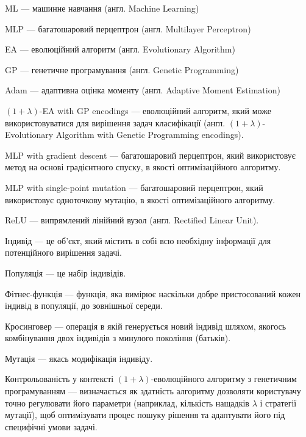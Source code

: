 ML --- машинне навчання (англ. Machine Learning)

MLP --- багатошаровий перцептрон (англ. Multilayer Perceptron)

EA --- еволюційний алгоритм (англ. Evolutionary Algorithm)

GP --- генетичне програмування (англ. Genetic Programming)

Adam --- адаптивна оцінка моменту (англ. Adaptive Moment Estimation)

$(1+\lambda)$-EA with GP encodings --- еволюційний алгоритм, який може використовуватися для вирішення задач класифікації (англ. $(1+\lambda)$-Evolutionary Algorithm with Genetic Programming encodings).

MLP with gradient descent --- багатошаровий перцептрон, який використовує метод на основі градієнтного спуску, в якості оптимізаційного алгоритму.

MLP with single-point mutation --- багатошаровий перцептрон, який використовує одноточкову мутацію, в якості оптимізаційного алгоритму.

ReLU --- випрямлений лінійний вузол (англ. Rectified Linear Unit).

Індивід --- це об'єкт, який містить в собі всю необхідну інформації для потенційного вирішення задачі.

Популяція --- це набір індивідів.

Фітнес-функція --- функція, яка вимірює наскільки добре пристосований кожен індивід в популяції, до зовнішньої середи.

Кросинговер --- операція в якій генерується новий індивід шляхом, якогось комбінування двох індивідів з минулого покоління (батьків).

Мутація --- якась модифікація індивіду.

Контрольованість у контексті $(1+\lambda)$-еволюційного алгоритму з генетичним програмуванням --- визначається як здатність алгоритму дозволяти користувачу точно регулювати його параметри (наприклад, кількість нащадків $\lambda$ і стратегії мутації), щоб оптимізувати процес пошуку рішення та адаптувати його під специфічні умови задачі.